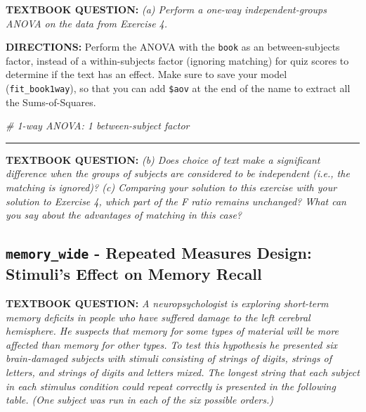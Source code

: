 \documentclass[
]{article}
\newenvironment{Shaded}{\begin{snugshade}}{\end{snugshade}}
\newcommand{\CommentTok}[1]{\textcolor[rgb]{0.56,0.35,0.01}{\textit{#1}}}
\begin{document}
\textbf{TEXTBOOK QUESTION:} \emph{(a) Perform a one-way
independent-groups ANOVA on the data from Exercise 4.}

\textbf{DIRECTIONS:} Perform the ANOVA with the \texttt{book} as an
between-subjects factor, instead of a within-subjects factor (ignoring
matching) for quiz scores to determine if the text has an effect. Make
sure to save your model (\texttt{fit\_book1way}), so that you can add
\texttt{\$aov} at the end of the name to extract all the
Sums-of-Squares.

\begin{Shaded}
\begin{Highlighting}[]
\CommentTok{# 1-way ANOVA: 1 between-subject factor}
\end{Highlighting}
\end{Shaded}

\begin{center}\rule{0.5\linewidth}{\linethickness}\end{center}

\textbf{TEXTBOOK QUESTION:} \emph{(b) Does choice of text make a
significant difference when the groups of subjects are considered to be
independent (i.e., the matching is ignored)? (c) Comparing your solution
to this exercise with your solution to Exercise 4, which part of the F
ratio remains unchanged? What can you say about the advantages of
matching in this case?}

\clearpage

\hypertarget{memory_wide---repeated-measures-design-stimulis-effect-on-memory-recall}{%
\subsection{\texorpdfstring{\texttt{memory\_wide} - Repeated Measures
Design: Stimuli's Effect on Memory
Recall}{memory\_wide - Repeated Measures Design: Stimuli's Effect on Memory Recall}}\label{memory_wide---repeated-measures-design-stimulis-effect-on-memory-recall}}

\textbf{TEXTBOOK QUESTION:} \emph{A neuropsychologist is exploring
short-term memory deficits in people who have suffered damage to the
left cerebral hemisphere. He suspects that memory for some types of
material will be more affected than memory for other types. To test this
hypothesis he presented six brain-damaged subjects with stimuli
consisting of strings of digits, strings of letters, and strings of
digits and letters mixed. The longest string that each subject in each
stimulus condition could repeat correctly is presented in the following
table. (One subject was run in each of the six possible orders.)}
\end{document}
